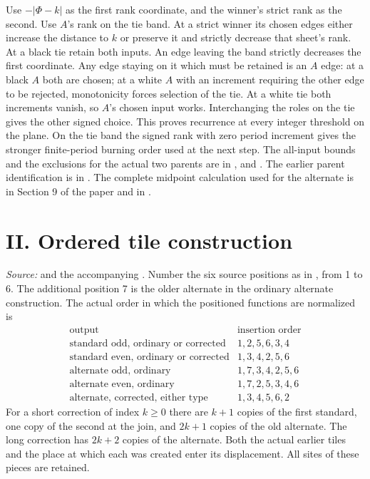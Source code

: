 \documentclass[11pt]{article}
\begin{document}
Use $-|\Phi-k|$ as the first rank coordinate, and the winner's strict rank as the second. Use $A$'s rank on the tie band. At a strict winner its chosen edges either increase the distance to $k$ or preserve it and strictly decrease that sheet's rank. At a black tie retain both inputs. An edge leaving the band strictly decreases the first coordinate. Any edge staying on it which must be retained is an $A$ edge: at a black $A$ both are chosen; at a white $A$ with an increment requiring the other edge to be rejected, monotonicity forces selection of the tie. At a white tie both increments vanish, so $A$'s chosen input works. Interchanging the roles on the tie gives the other signed choice. This proves recurrence at every integer threshold on the plane. On the tie band the signed rank with zero period increment gives the stronger finite-period burning order used at the next step. The all-input bounds and the exclusions for the actual two parents are in ,  and . The earlier parent identification is in . The complete midpoint calculation used for the alternate is in Section 9 of the paper and in .

\section*{II. Ordered tile construction}
\noindent\emph{Source:}  and the accompanying . Number the six source positions as in , from 1 to 6. The additional position 7 is the older alternate in the ordinary alternate construction. The actual order in which the positioned functions are normalized is
\[
\begin{array}{l|l}
\text{output}&\text{insertion order}\\ \hline
\text{standard odd, ordinary or corrected}&1,2,5,6,3,4\\
\text{standard even, ordinary or corrected}&1,3,4,2,5,6\\
\text{alternate odd, ordinary}&1,7,3,4,2,5,6\\
\text{alternate even, ordinary}&1,7,2,5,3,4,6\\
\text{alternate, corrected, either type}&1,3,4,5,6,2
\end{array}
\]
For a short correction of index $k\ge0$ there are $k+1$ copies of the first standard, one copy of the second at the join, and $2k+1$ copies of the old alternate. The long correction has $2k+2$ copies of the alternate. Both the actual earlier tiles and the place at which each was created enter its displacement. All sites of these pieces are retained.
\end{document}
